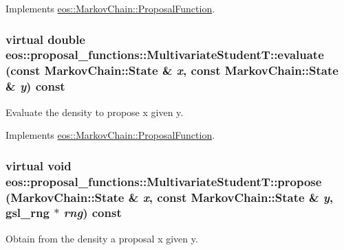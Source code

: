 Implements \hyperlink{structeos_1_1MarkovChain_1_1ProposalFunction_aea88a1340e10cc6a5b03d8b5483774f7}{eos::MarkovChain::ProposalFunction}.\hypertarget{classeos_1_1proposal__functions_1_1MultivariateStudentT_a9ca45b3dad5b0e6612ba27f7fb4e1973}{
\subsubsection[{evaluate}]{\setlength{\rightskip}{0pt plus 5cm}virtual double eos::proposal\_\-functions::MultivariateStudentT::evaluate (const {\bf MarkovChain::State} \& {\em x}, \/  const {\bf MarkovChain::State} \& {\em y}) const}}
\label{classeos_1_1proposal__functions_1_1MultivariateStudentT_a9ca45b3dad5b0e6612ba27f7fb4e1973}


Evaluate the density to propose x given y. 

Implements \hyperlink{structeos_1_1MarkovChain_1_1ProposalFunction_ae3f2c43980ec9dfe9f35d8139f2f4ec7}{eos::MarkovChain::ProposalFunction}.\hypertarget{classeos_1_1proposal__functions_1_1MultivariateStudentT_ad7c59db9bc93f0fb4b3204b8f272ba6c}{
\subsubsection[{propose}]{\setlength{\rightskip}{0pt plus 5cm}virtual void eos::proposal\_\-functions::MultivariateStudentT::propose ({\bf MarkovChain::State} \& {\em x}, \/  const {\bf MarkovChain::State} \& {\em y}, \/  gsl\_\-rng $\ast$ {\em rng}) const}}
\label{classeos_1_1proposal__functions_1_1MultivariateStudentT_ad7c59db9bc93f0fb4b3204b8f272ba6c}


Obtain from the density a proposal x given y. 

